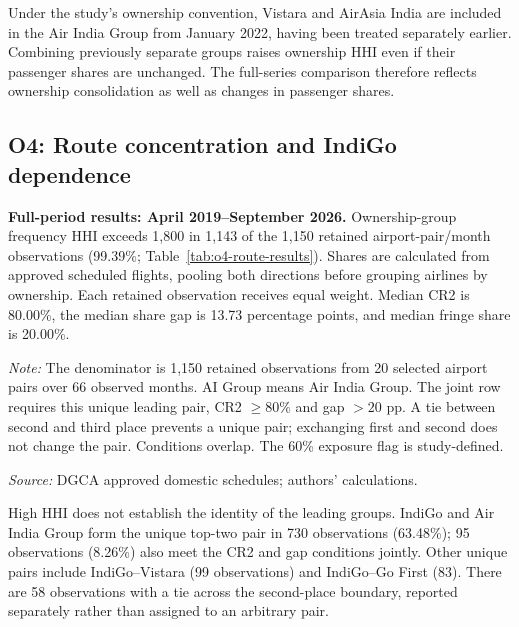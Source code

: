 \documentclass[12pt,a4paper]{article}
\begin{document}
Under the study's ownership convention, Vistara and AirAsia India are included in the Air India Group from January 2022, having been treated separately earlier. Combining previously separate groups raises ownership HHI even if their passenger shares are unchanged. The full-series comparison therefore reflects ownership consolidation as well as changes in passenger shares.

\clearpage
\subsection{O4: Route concentration and IndiGo dependence}
\textbf{Full-period results: April 2019--September 2026.}
Ownership-group frequency HHI exceeds 1,800 in 1,143 of the 1,150 retained airport-pair/month observations (99.39\%; Table~\ref{tab:o4-route-results}). Shares are calculated from approved scheduled flights, pooling both directions before grouping airlines by ownership. Each retained observation receives equal weight. Median CR2 is 80.00\%, the median share gap is 13.73 percentage points, and median fringe share is 20.00\%.

\begin{minipage}{\linewidth}
\captionsetup{font=small,labelfont=bf,justification=raggedright,singlelinecheck=false,hypcap=false}
\label{tab:o4-route-results}
\centering
{\small{}\setlength{\tabcolsep}{5pt}\par}
\vspace{4pt}
{\footnotesize{}\raggedright\textit{Note:} The denominator is 1,150 retained observations from 20 selected airport pairs over 66 observed months. AI Group means Air India Group. The joint row requires this unique leading pair, CR2 $\geq80\%$ and gap $>20$ pp. A tie between second and third place prevents a unique pair; exchanging first and second does not change the pair. Conditions overlap. The 60\% exposure flag is study-defined.\par
\textit{Source:} DGCA approved domestic schedules; authors' calculations.\par}
\end{minipage}

High HHI does not establish the identity of the leading groups. IndiGo and Air India Group form the unique top-two pair in 730 observations (63.48\%); 95 observations (8.26\%) also meet the CR2 and gap conditions jointly. Other unique pairs include IndiGo--Vistara (99 observations) and IndiGo--Go First (83). There are 58 observations with a tie across the second-place boundary, reported separately rather than assigned to an arbitrary pair.
\end{document}
